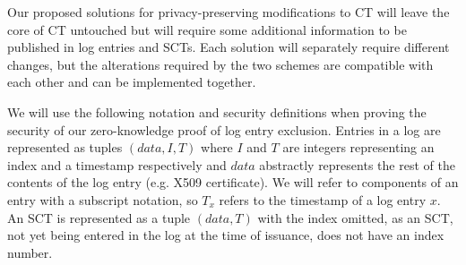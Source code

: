 \documentclass[letterpaper,twocolumn,10pt]{article}
\begin{document}
Our proposed solutions for privacy-preserving modifications to CT will leave the core of CT untouched but will require some additional information to be published in log entries and SCTs. Each solution will separately require different changes, but the alterations required by the two schemes are compatible with each other and can be implemented together. 

We will use the following notation and security definitions when proving the security of our zero-knowledge proof of log entry exclusion. Entries in a log are represented as tuples $(data, I, T)$ where $I$ and $T$ are integers representing an index and a timestamp respectively and $data$ abstractly represents the rest of the contents of the log entry (e.g. X509 certificate). We will refer to components of an entry with a subscript notation, so $T_x$ refers to the timestamp of a log entry $x$. An SCT is represented as a tuple $(data, T)$ with the index omitted, as an SCT, not yet being entered in the log at the time of issuance, does not have an index number.
\end{document}
